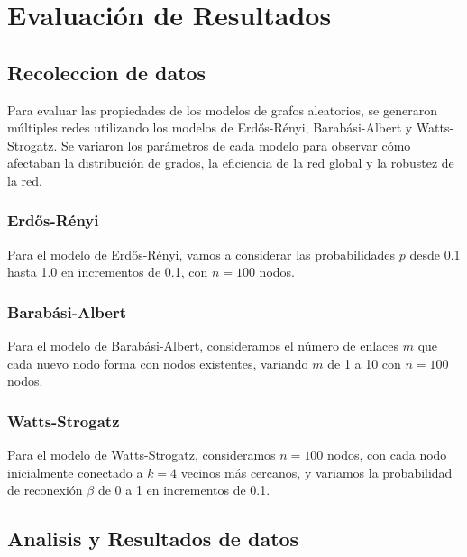 \documentclass[12pt]{book}
\begin{document}
\chapter{Evaluación de Resultados}

\section{Recoleccion de datos}
Para evaluar las propiedades de los modelos de grafos aleatorios, se generaron múltiples redes utilizando los modelos de Erdős-Rényi, Barabási-Albert y Watts-Strogatz. Se variaron los parámetros de cada modelo para observar cómo afectaban la distribución de grados, la eficiencia de la red global y la robustez de la red. 

\subsection{Erdős-Rényi}
Para el modelo de Erdős-Rényi, vamos a considerar las probabilidades 
\(p\) desde 0.1 hasta 1.0 en incrementos de 0.1, con \(n=100\) nodos.
\subsection{Barabási-Albert}
Para el modelo de Barabási-Albert, consideramos el número de enlaces 
\(m\) que cada nuevo nodo forma con nodos existentes, variando \(m\) de 1 a 10 con \(n=100\) nodos.
\subsection{Watts-Strogatz}
Para el modelo de Watts-Strogatz, consideramos 
\(n=100\) nodos, con cada nodo inicialmente conectado a 
\(k=4\) vecinos más cercanos, y variamos la probabilidad de reconexión 
\(\beta \) de 0 a 1 en incrementos de 0.1.

\section{Analisis y Resultados de datos}
\end{document}
